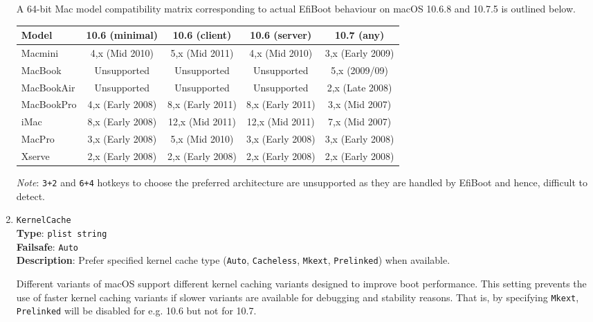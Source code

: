 \documentclass[]{article}
\begin{document}
\begin{enumerate}
  A 64-bit Mac model compatibility matrix corresponding to actual
  EfiBoot behaviour on macOS 10.6.8 and 10.7.5 is outlined below.

  \begin{center}
  \begin{tabular}{|p{0.9in}|c|c|c|c|}
  \hline
  \textbf{Model} & \textbf{10.6 (minimal)} & \textbf{10.6 (client)} & \textbf{10.6 (server)} & \textbf{10.7 (any)} \\
  \hline
  Macmini & 4,x (Mid 2010) & 5,x (Mid 2011) & 4,x (Mid 2010) & 3,x (Early 2009) \\
  \hline
  MacBook & Unsupported & Unsupported & Unsupported & 5,x (2009/09) \\
  \hline
  MacBookAir & Unsupported & Unsupported & Unsupported & 2,x (Late 2008) \\
  \hline
  MacBookPro & 4,x (Early 2008) & 8,x (Early 2011) & 8,x (Early 2011) & 3,x (Mid 2007) \\
  \hline
  iMac & 8,x (Early 2008) & 12,x (Mid 2011) & 12,x (Mid 2011) & 7,x (Mid 2007) \\
  \hline
  MacPro & 3,x (Early 2008) & 5,x (Mid 2010) & 3,x (Early 2008) & 3,x (Early 2008) \\
  \hline
  Xserve & 2,x (Early 2008) & 2,x (Early 2008) & 2,x (Early 2008) & 2,x (Early 2008) \\
  \hline
  \end{tabular}
  \end{center}

  \emph{Note}: \texttt{3+2} and \texttt{6+4} hotkeys to choose the preferred architecture
  are unsupported as they are handled by EfiBoot and hence, difficult to detect.

\item
  \texttt{KernelCache}\\
  \textbf{Type}: \texttt{plist\ string}\\
  \textbf{Failsafe}: \texttt{Auto}\\
  \textbf{Description}: Prefer specified kernel cache type (\texttt{Auto}, \texttt{Cacheless},
  \texttt{Mkext}, \texttt{Prelinked}) when available.

  Different variants of macOS support different kernel caching variants designed to improve
  boot performance. This setting prevents the use of faster kernel caching variants
  if slower variants are available for debugging and stability reasons. That is, by
  specifying \texttt{Mkext}, \texttt{Prelinked} will be disabled for e.g. 10.6 but not for 10.7.


\end{enumerate}
\end{document}
